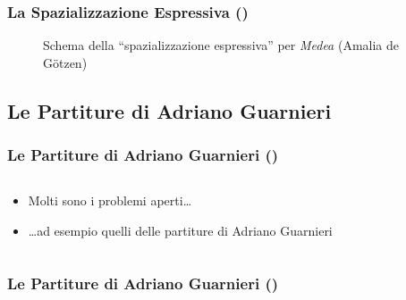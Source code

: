 \documentclass[compress]{beamer}
\newcommand{\oggplay}[2]{\href{run: ogg123 -d esd \exampledir/#1}{#2 \pgfuseimage{speaker}}}
\begin{document}
\begin{frame}
    \frametitle{La Spazializzazione Espressiva ()}

    \begin{center}
        \begin{figure}
            \begin{center}
            \end{center}
            \caption{Schema della ``spazializzazione espressiva'' per \emph{Medea} (Amalia de G\"otzen)}
            \label{fig:medea processing}
        \end{figure}
    \end{center}
    
\end{frame}

\subsection[Guarnieri]{Le Partiture di Adriano Guarnieri}

\setcounter{ms}{0}

\begin{frame}
    \frametitle{Le Partiture di Adriano Guarnieri ()}

    \begin{columns}[T]
        \begin{column}{0.7\textwidth}
				    \begin{itemize}[<+- | alert@+->]
				       \item Molti sono i problemi aperti\dots
				       \item \dots ad esempio quelli delle partiture di Adriano
				                    Guarnieri
				    \end{itemize}
        \end{column}
        \begin{column}{0.3\textwidth}
        \end{column}
    \end{columns}
    
\end{frame}

\begin{frame}
    \frametitle{Le Partiture di Adriano Guarnieri ()}

    \begin{columns}[T]
        \begin{column}{0.9\textwidth}
            \href{run: display \imagedir/Guarnieri-Passione-Lettera_M}
                {}
        \end{column}
        \begin{column}{0.1\textwidth}
            \oggplay{Guarnieri-Passione_Lettera_M.ogg}{}
        \end{column}
    \end{columns}

\end{frame}
\end{document}

